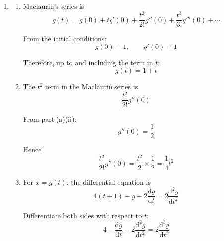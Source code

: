 \documentclass[leqno]{article}
\begin{document}
\begin{enumerate}[
  label=\textbf{\arabic*.},
  leftmargin=*,
  topsep=0pt,
  partopsep=0pt,
  parsep=0pt
]
\begin{djsSolution}
\begin{enumerate}[label=\textbf{(\alph*)}]
\begin{enumerate}[label=(\roman*)]
    The resistive force acts opposite to the motion, so it acts in the negative $x$-direction. Hence its contribution is
    \[
    -2\left|\frac{\mathrm{d}x}{\mathrm{d}t}\right|=-2\frac{\mathrm{d}x}{\mathrm{d}t}
    \]

    So the term involving $\frac{\mathrm{d}x}{\mathrm{d}t}$ is negative.

    \item When $t=0$, $x=1$ and $\frac{\mathrm{d}x}{\mathrm{d}t}=1$. Substituting these and $t=0$ into
    \[
    4(t+1)-x-2\frac{\mathrm{d}x}{\mathrm{d}t}=2\frac{\mathrm{d}^2x}{\mathrm{d}t^2}
    \]

    gives
    \begin{align*}
    4(0+1)-1-2(1)&=2\frac{\mathrm{d}^2x}{\mathrm{d}t^2}\\
    4-1-2&=2\frac{\mathrm{d}^2x}{\mathrm{d}t^2}\\
    1&=2\frac{\mathrm{d}^2x}{\mathrm{d}t^2}
    \end{align*}

    Hence
    \[
    \frac{\mathrm{d}^2x}{\mathrm{d}t^2}=\frac12
    \]

    So the acceleration at $t=0$ is $\frac12\,\mathrm{m\,s^{-2}}$.
  \end{enumerate}

  \item
  \begin{enumerate}[label=(\roman*)]
    \item Maclaurin's series is
    \[
    g(t)=g(0)+tg'(0)+\frac{t^2}{2!}g''(0)+\frac{t^3}{3!}g'''(0)+\cdots
    \]

    From the initial conditions:
    \[
    g(0)=1,\qquad g'(0)=1
    \]

    Therefore, up to and including the term in $t$:
    \[
    g(t)=1+t
    \]

    \item The $t^2$ term in the Maclaurin series is
    \[
    \frac{t^2}{2!}g''(0)
    \]

    From part (a)(ii):
    \[
    g''(0)=\frac12
    \]

    Hence
    \[
    \frac{t^2}{2!}g''(0)
    =\frac{t^2}{2}\times\frac12
    =\frac14 t^2
    \]

    \item For $x=g(t)$, the differential equation is
    \[
    4(t+1)-g-2\frac{\mathrm{d}g}{\mathrm{d}t}=2\frac{\mathrm{d}^2g}{\mathrm{d}t^2}
    \]

    Differentiate both sides with respect to $t$:
    \[
    4-\frac{\mathrm{d}g}{\mathrm{d}t}-2\frac{\mathrm{d}^2g}{\mathrm{d}t^2}
    =2\frac{\mathrm{d}^3g}{\mathrm{d}t^3}
    \]


\end{enumerate}
\end{enumerate}
\end{djsSolution}
\end{enumerate}
\end{document}

